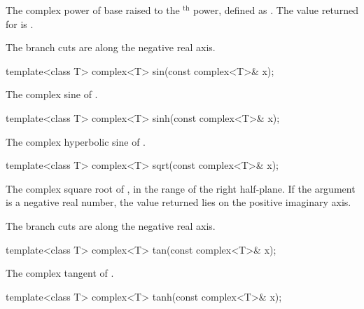 \begin{itemdescr}
\pnum
\returns
The complex power of base  raised to the $^\text{th}$ power,
defined as
.
The value returned for
is .

\pnum
\remarks
The branch cuts are along the negative real axis.
\end{itemdescr}

%
\begin{itemdecl}
template<class T> complex<T> sin(const complex<T>& x);
\end{itemdecl}

\begin{itemdescr}
\pnum
\returns
The complex sine of .
\end{itemdescr}

%
\begin{itemdecl}
template<class T> complex<T> sinh(const complex<T>& x);
\end{itemdecl}

\begin{itemdescr}
\pnum
\returns
The complex hyperbolic sine of .
\end{itemdescr}

%
\begin{itemdecl}
template<class T> complex<T> sqrt(const complex<T>& x);
\end{itemdecl}

\begin{itemdescr}
\pnum
\returns
The complex square root of , in the range of the right
half-plane.
If the argument is a negative real number, the
value returned lies on the positive imaginary axis.

\pnum
\remarks
The branch cuts are along the negative real axis.
\end{itemdescr}

%
\begin{itemdecl}
template<class T> complex<T> tan(const complex<T>& x);
\end{itemdecl}

\begin{itemdescr}
\pnum
\returns
The complex tangent of .
\end{itemdescr}

%
\begin{itemdecl}
template<class T> complex<T> tanh(const complex<T>& x);
\end{itemdecl}

